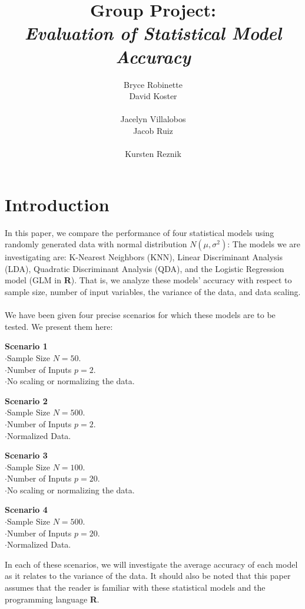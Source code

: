 \documentclass[11pt, oneside]{article}
\title{Group Project:\\
\emph{Evaluation of Statistical Model Accuracy}
}
\author{\hspace{0.0cm}\parbox[t][2.5cm][t]{4cm}{
	Bryce Robinette\\
	David Koster\\
}
\parbox[t][2.5cm][t]{4cm}{
	Jacelyn Villalobos\\
	Jacob Ruiz\\
}
Kursten Reznik 
}
\date{}
\begin{document}
\maketitle




\section*{Introduction}
In this paper, we compare the performance of four statistical models using randomly generated data with normal distribution $N(\mu, \sigma^2)$: The models we are investigating are: K-Nearest Neighbors (KNN), Linear Discriminant Analysis (LDA), Quadratic Discriminant Analysis (QDA), and the Logistic Regression model (GLM in \textbf\textsf{R}). That is, we analyze these models' accuracy with respect to sample size, number of input variables, the variance of the data, and data scaling.\\
\\
We have been given four precise scenarios for which these models are to be tested. We present them here:\\


\hspace{1.5cm}\parbox[t][2.5cm][t]{8cm}{
	\textbf{Scenario 1}\\
	$\cdot$Sample Size $N = 50.$\\
	$\cdot$Number of Inputs $p = 2$.\\
	$\cdot$No scaling or normalizing the data.
}
\parbox[t][2.5cm][t]{8cm}{
	\textbf{Scenario 2}\\
	$\cdot$Sample Size $N = 500.$\\
	$\cdot$Number of Inputs $p = 2$.\\
	$\cdot$Normalized Data.
}

\hspace{1.5cm}\parbox[t][2.5cm][t]{8cm}{
	\textbf{Scenario 3}\\
	$\cdot$Sample Size $N = 100.$\\
	$\cdot$Number of Inputs $p = 20$.\\
	$\cdot$No scaling or normalizing the data.
}
\parbox[t][2.5cm][t]{8cm}{
	\textbf{Scenario 4}\\
	$\cdot$Sample Size $N = 500.$\\
	$\cdot$Number of Inputs $p = 20$.\\
	$\cdot$Normalized Data.
}

In each of these scenarios, we will investigate the average accuracy of each model as it relates to the variance of the data. It should also be noted that this paper assumes that the reader is familiar with these statistical models and the programming language \textbf\textsf{R}.
\end{document}
